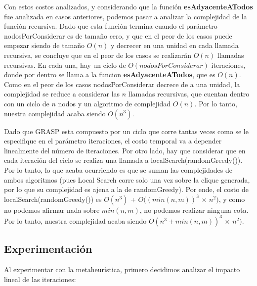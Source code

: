Con estos costos analizados, y considerando que la función \textbf{esAdyacenteATodos} fue analizada en casos anteriores, podemos pasar a analizar la complejidad de la función recursiva. Dado que esta función termina cuando el parámetro nodosPorConsiderar es de tamaño cero, y que en el peor de los casos puede empezar siendo de tamaño $O(n)$ y decrecer en una unidad en cada llamada recursiva, se concluye que en el peor de los casos se realizarán $O(n)$ llamadas recursivas. En cada una, hay un ciclo de $O(nodosPorConsiderar)$ iteraciones, donde por dentro se llama a la funcion \textbf{esAdyacenteATodos}, que es $O(n)$. Como en el peor de los casos nodosPorConsiderar decrece de a una unidad, la complejidad se reduce a considerar las $n$ llamadas recursivas, que cuentan dentro con un ciclo de $n$ nodos y un algoritmo de complejidad $O(n)$. Por lo tanto, nuestra complejidad acaba siendo $O(n^3)$.

Dado que GRASP esta compuesto por un ciclo que corre tantas veces como se le especifique en el parámetro iteraciones, el costo temporal va a depender linealmente del número de iteraciones. Por otro lado, hay que considerar que en cada iteración del ciclo se realiza una llamada a localSearch(randomGreedy()). Por lo tanto, lo que acaba ocurriendo es que se suman las complejidades de ambos algoritmos (pues Local Search corre solo una vez sobre la clique generada, por lo que su complejidad es ajena a la de randomGreedy). Por ende, el costo de localSearch(randomGreedy()) es $O(n^3)$ + $O((min(n,m))^3$ $\times$ $n^2)$, y como no podemos afirmar nada sobre $min(n,m)$, no podemos realizar ninguna cota. Por lo tanto, nuestra complejidad acaba siendo $O(n^3 + min(n,m))^3$ $\times$ $n^2)$.


\subsection{Experimentación}

Al experimentar con la metaheurística, primero decidimos analizar el impacto lineal de las iteraciones:

